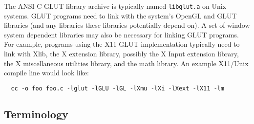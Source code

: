 \documentclass[titlepage,twoside]{article}
\begin{document}
The ANSI C GLUT library archive is typically named {\tt libglut.a} on Unix
systems.  GLUT programs need to link with the system's OpenGL and GLUT libraries
(and any libraries these libraries potentially depend on).
A set of window system dependent libraries may also be necessary
for linking GLUT programs.  For example, programs using the X11 GLUT
implementation typically need to link with Xlib, the X extension
library, possibly the X Input extension library,  the X miscellaneous
utilities library, and the math library.  An example X11/Unix
compile line would look like:
\begin{verbatim}
  cc -o foo foo.c -lglut -lGLU -lGL -lXmu -lXi -lXext -lX11 -lm
\end{verbatim}

\subsection{Terminology}
\end{document}
